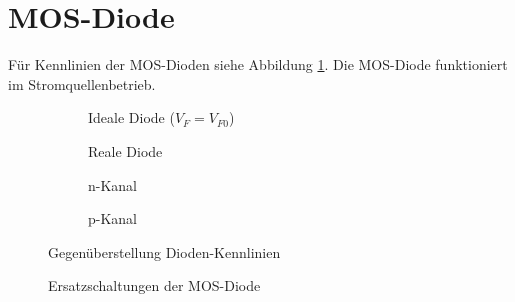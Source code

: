 \section{MOS-Diode}
Für Kennlinien der MOS-Dioden siehe Abbildung \ref{fig:diodenKennlinien}. Die MOS-Diode funktioniert im Stromquellenbetrieb.
\begin{figure}[h]
	\centering
	\begin{subfigure}[b]{5cm}
		\centering
		\caption{Ideale Diode ($V_F = V_{F0}$)}
	\end{subfigure}
	\begin{subfigure}[b]{4cm}
		\centering
		\caption{Reale Diode}
	\end{subfigure} \quad
	\begin{subfigure}[b]{4cm}
		\centering
		\caption{n-Kanal}
	\end{subfigure}
	\begin{subfigure}[b]{4cm}
		\centering
		\caption{p-Kanal}
	\end{subfigure}
	\hspace{1.5cm}
	
	\begin{subfigure}[b]{4cm}
	\end{subfigure} \quad
	\begin{subfigure}[b]{4cm}
		\centering
	\end{subfigure} \qquad
	\begin{subfigure}[b]{8cm}
		\centering
	\end{subfigure}			
	\caption{Gegenüberstellung Dioden-Kennlinien}
	\label{fig:diodenKennlinien}
\end{figure}

\begin{figure}[h]
	\centering
	\begin{subfigure}[b]{5cm}
		\centering
	\end{subfigure} \qquad\qquad
	\begin{subfigure}[b]{3cm}
		\centering
	\end{subfigure} \qquad\qquad
	\begin{subfigure}[b]{2cm}
		\centering
	\end{subfigure}
	\caption{Ersatzschaltungen der MOS-Diode}
\end{figure}

